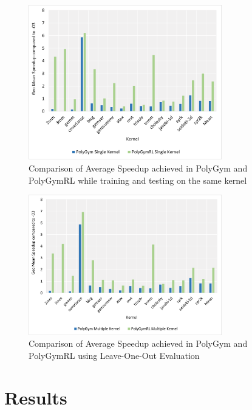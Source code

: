 \documentclass[logo,msc]{infthesis}           %
\begin{document}
\begin{preliminary}
\begin{figure}[htbp]
  \centering
  \includegraphics[width=0.75\textwidth]{Images/Chart_Single_PolyGym_PolyGymRL.png}    
  \caption{Comparison of Average Speedup achieved in PolyGym and PolyGymRL while training and testing on the same kernel}
  \label{fig:single_PolyGym_PolyGymRL}
\end{figure}

\begin{figure}[htbp]
  \centering
  \includegraphics[width=0.75\textwidth]{Images/Chart_Multiple_PolyGym_PolyGymRL.png}    
  \caption{Comparison of Average Speedup achieved in PolyGym and PolyGymRL using Leave-One-Out Evaluation}
  \label{fig:multi_PolyGym_PolyGymRL}
\end{figure}
 




\appendix

\chapter{Results}




\end{preliminary}
\end{document}
